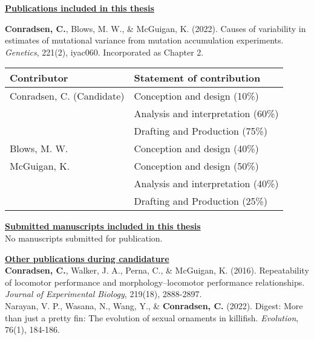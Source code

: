 


\noindent\textbf{\underline{Publications included in this thesis}}

\noindent\textbf{Conradsen, C.}, Blows, M. W., \& McGuigan, K. (2022). Causes of variability in estimates of mutational variance from mutation accumulation experiments. \textit{Genetics}, 221(2), iyac060. Incorporated as Chapter 2.

\begin{center}
\begin{tabular}{ll} 
\toprule
Contributor & Statement of contribution \\
 \hline
 Conradsen, C. (Candidate) & Conception and design (10\%)  \\ 
 & Analysis and interpretation (60\%)  \\ 
 & Drafting and Production (75\%)  \\[2ex] 
Blows, M. W. & Conception and design (40\%)  \\ [2ex]
McGuigan, K. & Conception and design (50\%)  \\ 
& Analysis and interpretation (40\%)  \\ 
 & Drafting and Production (25\%)  \\ 
 \bottomrule
\end{tabular}
\end{center}
\newpage

\noindent\textbf{\underline{Submitted manuscripts included in this thesis}}\\
\bigskip
\noindent No manuscripts submitted for publication.\\
\vspace{36pt}

\noindent\textbf{\underline{Other publications during candidature}}\\
\bigskip
\noindent\textbf{Conradsen, C.}, Walker, J. A., Perna, C., \& McGuigan, K. (2016). Repeatability of locomotor performance and morphology–locomotor performance relationships. \textit{Journal of Experimental Biology}, 219(18), 2888-2897.\\
\bigskip
\noindent Narayan, V. P., Wasana, N., Wang, Y., \& \textbf{Conradsen, C.} (2022). Digest: More than just a pretty fin: The evolution of sexual ornaments in killifish. \textit{Evolution}, 76(1), 184-186.\\
\vspace{36pt}

